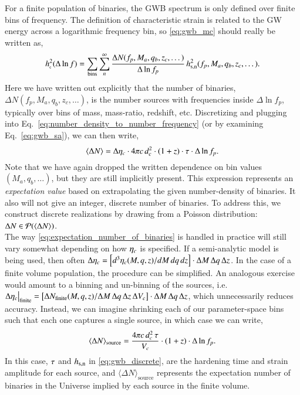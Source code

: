 \documentclass[useAMS, usenatbib]{src/mnras}
\begin{document}
        For a finite population of binaries, the GWB spectrum is only defined over finite bins of frequency.  The definition of characteristic strain is related to the GW energy across a logarithmic frequency bin, so \eqref{eq:gwb_mc} should really be written as,
        \begin{equation}
            \label{eq:gwb_discrete}
            \hc^2(\Delta \ln f) = \sum_\textrm{bins} \sum_n^\infty \frac{\Delta N(f_p,M_a,q_b,z_c,\dots)}{\Delta \ln f_p} \, \hsn^2(f_p,M_a,q_b,z_c,\dots).
        \end{equation}
        Here we have written out explicitly that the number of binaries, $\Delta N(f_p,M_a,q_b,z_c,\dots)$, is the number sources with frequencies inside $\Delta \ln f_p$, typically over bins of mass, mass-ratio, redshift, etc.  Discretizing and plugging into Eq.~\ref{eq:number_density_to_number_frequency} (or by examining Eq.~\ref{eq:gwb_sa}), we can then write,
        \begin{equation}
            \label{eq:expectation_number_of_binaries}
            \langle \Delta N \rangle = \Delta \eta_c \cdot 4\pi c \, d_c^2 \cdot (1+z) \cdot \tau \cdot \Delta \ln f_p.
        \end{equation}
        Note that we have again dropped the written dependence on bin values $(M_a, q_b, \dots)$, but they are still implicitly present.  This expression represents an \textit{expectation value} based on extrapolating the given number-density of binaries.  It also will not give an integer, discrete number of binaries.  To address this, we construct discrete realizations by drawing from a Poisson distribution: $\Delta N \in \mathcal{P}(\langle \Delta N \rangle)$. \\

        The way \eqref{eq:expectation_number_of_binaries} is handled in practice will still vary somewhat depending on how $\eta_c$ is specified.  If a semi-analytic model is being used, then often
        $\Delta \eta_c = \left[ d^3 \eta_c(M,q,z) / dM \, dq \, dz \right] \cdot \Delta M \, \Delta q \, \Delta z$.  In the case of a finite volume population, the procedure can be simplified.  An analogous exercise would amount to a binning and un-binning of the sources, i.e.~$\Delta \eta_c \big|_\textrm{finite} = \left[ \Delta N_\textrm{finite}(M,q,z) / \Delta M \, \Delta q \, \Delta z \, \Delta V_c \right] \cdot \Delta M \, \Delta q \, \Delta z$, which unnecessarily reduces accuracy.  Instead, we can imagine shrinking each of our parameter-space bins such that each one captures a single source, in which case we can write,
        \begin{equation}
            \label{eq:expectation_number_of_single_binary}
            \langle \Delta N \rangle_\textrm{source} = \frac{4\pi c \, d_c^2 \, \tau}{V_c} \cdot (1+z) \cdot \Delta \ln f_p.
        \end{equation}
        In this case, $\tau$ and $h_{\textrm{s,n}}$ in \eqref{eq:gwb_discrete}, are the hardening time and strain amplitude for each source, and $\langle \Delta N \rangle_\textrm{source}$ represents the expectation number of binaries in the Universe implied by each source in the finite volume.
\end{document}

